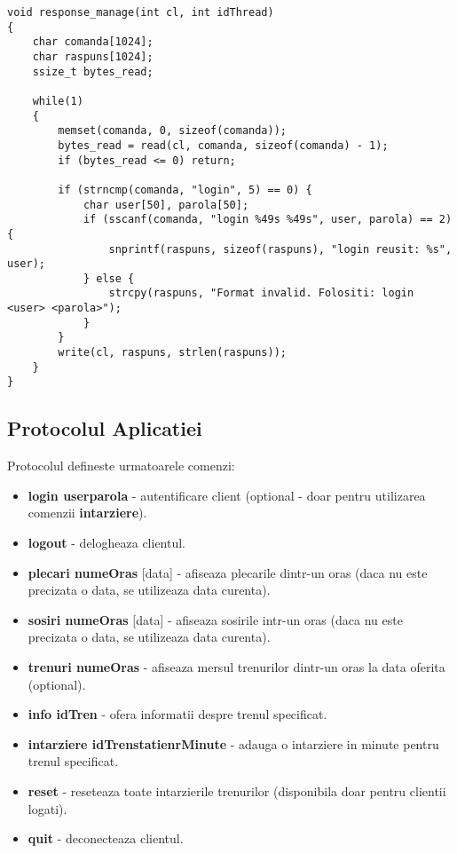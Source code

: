\documentclass[runningheads]{llncs}
\begin{document}
\begin{lstlisting}[caption={Fragment de cod din server.c}, label={lst:server-code}]
void response_manage(int cl, int idThread)
{
    char comanda[1024];
    char raspuns[1024]; 
    ssize_t bytes_read;

    while(1)
    {
        memset(comanda, 0, sizeof(comanda));
        bytes_read = read(cl, comanda, sizeof(comanda) - 1);
        if (bytes_read <= 0) return;

        if (strncmp(comanda, "login", 5) == 0) {
            char user[50], parola[50];
            if (sscanf(comanda, "login %49s %49s", user, parola) == 2) {
                snprintf(raspuns, sizeof(raspuns), "login reusit: %s", user);
            } else {
                strcpy(raspuns, "Format invalid. Folositi: login <user> <parola>");
            }
        }
        write(cl, raspuns, strlen(raspuns));
    }
}
\end{lstlisting}
\subsection{Protocolul Aplicatiei}
Protocolul defineste urmatoarele comenzi:
\begin{itemize}
    \item \textbf{login \textlangle user\textrangle \textlangle parola\textrangle} - autentificare client (optional - doar pentru utilizarea comenzii \textbf{intarziere}).
    \item \textbf{logout} - delogheaza clientul.
    \item \textbf{plecari \textlangle numeOras\textrangle} [data] - afiseaza plecarile dintr-un oras (daca nu este precizata o data, se utilizeaza data curenta).
    \item \textbf{sosiri \textlangle numeOras\textrangle} [data] - afiseaza sosirile intr-un oras (daca nu este precizata o data, se utilizeaza data curenta).
    \item \textbf{trenuri \textlangle numeOras\textrangle [DD.MM.YYYY]} - afiseaza mersul trenurilor dintr-un oras la data oferita (optional).
    \item \textbf{info \textlangle idTren\textrangle} - ofera informatii despre trenul specificat.
    \item \textbf{intarziere \textlangle idTren\textrangle \textlangle statie\textrangle \textlangle nrMinute\textrangle} - adauga o intarziere in minute pentru trenul specificat.
    \item \textbf{reset} - reseteaza toate intarzierile trenurilor (disponibila doar pentru clientii logati).
    \item \textbf{quit} - deconecteaza clientul.
\end{itemize}
\end{document}
